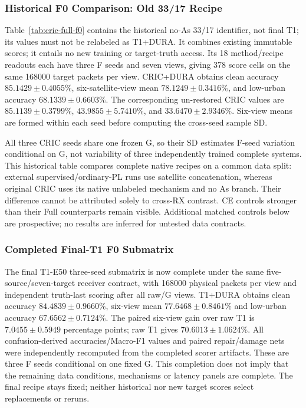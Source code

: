 \subsubsection{Historical F0 Comparison: Old 33/17 Recipe}
Table~\ref{tab:cric-full-f0} contains the historical no-As 33/17 identifier, not final T1; its values must not be relabeled as T1+DURA. It combines existing immutable scores; it entails no new training or target-truth access. Its 18 method/recipe readouts each have three F seeds and seven views, giving 378 score cells on the same 168000 target packets per view. CRIC+DURA obtains clean accuracy $85.1429\pm0.4055\%$, six-satellite-view mean $78.1249\pm0.3416\%$, and low-urban accuracy $68.1339\pm0.6603\%$. The corresponding un-restored CRIC values are $85.1139\pm0.3799\%$, $43.9855\pm5.7410\%$, and $33.6470\pm2.9346\%$. Six-view means are formed within each seed before computing the cross-seed sample SD.

All three CRIC seeds share one frozen G, so their SD estimates F-seed variation conditional on G, not variability of three independently trained complete systems. This historical table compares complete native recipes on a common data split: external supervised/ordinary-PL runs use satellite concatenation, whereas original CRIC uses its native unlabeled mechanism and no As branch. Their difference cannot be attributed solely to cross-RX contrast. CE controls stronger than their Full counterparts remain visible. Additional matched controls below are prospective; no results are inferred for untested data contracts.

\subsubsection{Completed Final-T1 F0 Submatrix}

The final T1-E50 three-seed submatrix is now complete under the same five-source/seven-target receiver contract, with 168000 physical packets per view and independent truth-last scoring after all raw/G views. T1+DURA obtains clean accuracy $84.4839\pm0.9660\%$, six-view mean $77.6468\pm0.8461\%$ and low-urban accuracy $67.6562\pm0.7124\%$. The paired six-view gain over raw T1 is $7.0455\pm0.5949$ percentage points; raw T1 gives $70.6013\pm1.0624\%$. All confusion-derived accuracies/Macro-F1 values and paired repair/damage nets were independently recomputed from the completed scorer artifacts. These are three F seeds conditional on one fixed G. This completion does not imply that the remaining data conditions, mechanisms or latency panels are complete. The final recipe stays fixed; neither historical nor new target scores select replacements or reruns.

